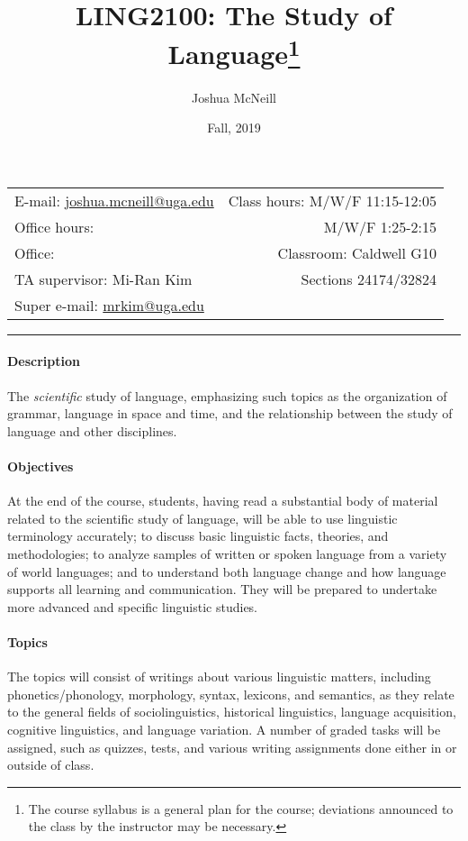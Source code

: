 \documentclass{article}
\title{LING2100: The Study of Language\footnote{The course syllabus is a general plan for the course; deviations announced to the class by the instructor may be necessary.}}
\author{Joshua McNeill}
\date{Fall, 2019}
\begin{document}
  \maketitle

  \begin{center}
    \begin{tabular}{@{} l r @{}}
      E-mail: \url{joshua.mcneill@uga.edu}              & Class hours: M/W/F 11:15-12:05\\
      Office hours:   & M/W/F 1:25-2:15\\
      Office:      & Classroom: Caldwell G10\\
      TA supervisor: Mi-Ran Kim                         & Sections 24174/32824\\
      Super e-mail: \url{mrkim@uga.edu}
    \end{tabular}
  \end{center}

  \hrule

  \paragraph{Description}
    The \emph{scientific} study of language, emphasizing such topics as the organization of grammar, language in space and time, and the relationship between the study of language and other disciplines.

  \paragraph{Objectives}
    At the end of the course, students, having read a substantial body of material related to the scientific study of language, will be able to use linguistic terminology accurately; to discuss basic linguistic facts, theories, and methodologies; to analyze samples of written or spoken language from a variety of world languages; and to understand both language change and how language supports all learning and communication. They will be prepared to undertake more advanced and specific linguistic studies.

  \paragraph{Topics}
    The topics will consist of writings about various linguistic matters, including phonetics/phonology, morphology, syntax, lexicons, and semantics, as they relate to the general fields of sociolinguistics, historical linguistics, language acquisition, cognitive linguistics, and language variation. A number of graded tasks will be assigned, such as quizzes, tests, and various writing assignments done either in or outside of class.
\end{document}
